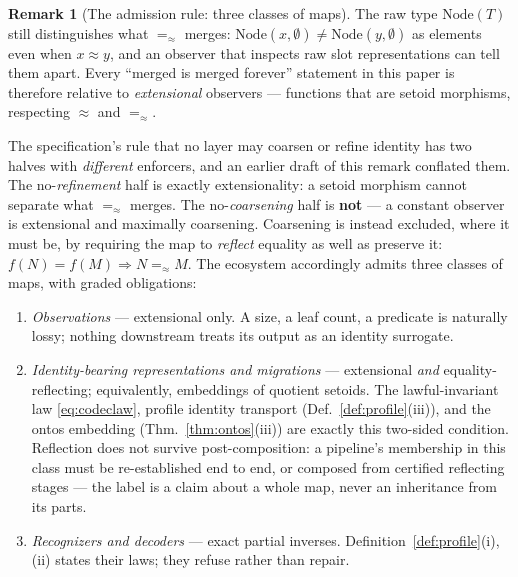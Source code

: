 \documentclass[11pt]{article}
\theoremstyle{definition}
\newtheorem{remark}[theorem]{Remark}
\newcommand{\NodeT}[1]{\mathrm{Node}(#1)}
\newcommand{\eqS}{=_{\approx}}                     %
\begin{document}
\begin{remark}[The admission rule: three classes of maps]\label{rem:extensional}
The raw type $\NodeT{T}$ still distinguishes what $\eqS$ merges:
$\mathrm{Node}(x, \emptyset) \neq \mathrm{Node}(y, \emptyset)$
as elements even when $x \approx y$, and an observer that inspects raw slot
representations can tell them apart. Every ``merged is merged forever'' statement in
this paper is therefore relative to \emph{extensional} observers --- functions that
are setoid morphisms, respecting $\approx$ and $\eqS$.

The specification's rule that no layer may coarsen or refine identity has two halves
with \emph{different} enforcers, and an earlier draft of this remark conflated them.
The no-\emph{refinement} half is exactly extensionality: a setoid morphism cannot
separate what $\eqS$ merges. The no-\emph{coarsening} half is \textbf{not} ---
a constant observer is extensional and maximally coarsening. Coarsening is instead
excluded, where it must be, by requiring the map to \emph{reflect} equality as well
as preserve it: $f(N) = f(M) \Rightarrow N \eqS M$. The ecosystem accordingly admits
three classes of maps, with graded obligations:

\begin{enumerate}[label=(\alph*), leftmargin=2.2em]
\item \emph{Observations} --- extensional only. A size, a leaf count, a predicate is
  naturally lossy; nothing downstream treats its output as an identity surrogate.
\item \emph{Identity-bearing representations and migrations} --- extensional
  \emph{and} equality-reflecting; equivalently, embeddings of quotient setoids. The
  lawful-invariant law \eqref{eq:codeclaw}, profile identity transport
  (Def.~\ref{def:profile}(iii)), and the ontos embedding
  (Thm.~\ref{thm:ontos}(iii)) are exactly this two-sided condition. Reflection does
  not survive post-composition: a pipeline's membership in this class must be
  re-established end to end, or composed from certified reflecting stages --- the
  label is a claim about a whole map, never an inheritance from its parts.
\item \emph{Recognizers and decoders} --- exact partial inverses.
  Definition~\ref{def:profile}(i),(ii) states their laws; they refuse rather than repair.
\end{enumerate}


\end{remark}
\end{document}

